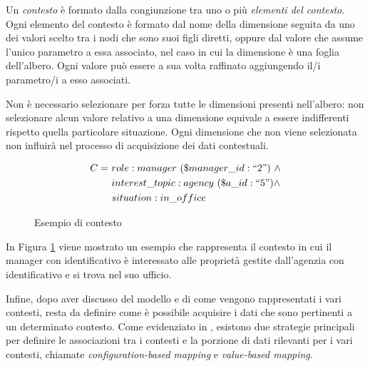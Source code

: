Un \emph{contesto} è formato dalla congiunzione tra uno o più \emph{elementi del contesto}. Ogni elemento del contesto è formato dal nome della dimensione seguita da uno dei valori scelto tra i nodi che sono suoi figli diretti, oppure dal valore che assume l'unico parametro a essa associato, nel caso in cui la dimensione è una foglia dell'albero. Ogni valore può essere a sua volta raffinato aggiungendo il/i parametro/i a esso associati.

Non è necessario selezionare per forza tutte le dimensioni presenti nell'albero: non selezionare alcun valore relativo a una dimensione equivale a essere indifferenti rispetto quella particolare situazione. Ogni dimensione che non viene selezionata non influirà nel processo di acquisizione dei dati contestuali.

\begin{figure}[ht]
	\begin{align*}
		C =\ &role : manager\ (\$manager\_id : ``2")\ \land \\
			&interest\_topic : agency\ (\$a\_id : ``5") \land \\
			&situation : in\_office
	\end{align*}
	\caption{Esempio di contesto}\label{fig:esempio-contesto-base}
\end{figure}

In Figura \ref{fig:esempio-contesto-base} viene mostrato un esempio che rappresenta il contesto in cui il manager con identificativo  è interessato alle proprietà gestite dall'agenzia con identificativo  e si trova nel suo ufficio.

Infine, dopo aver discusso del modello e di come vengono rappresentati i vari contesti, resta da definire come è possibile acquisire i dati che sono pertinenti a un determinato contesto. Come evidenziato in \cite{DBLP:journals/cacm/BolchiniCOQRST09}, esistono due strategie principali per definire le associazioni tra i contesti e la porzione di dati rilevanti per i vari contesti, chiamate \emph{configuration-based mapping} e \emph{value-based mapping}.

